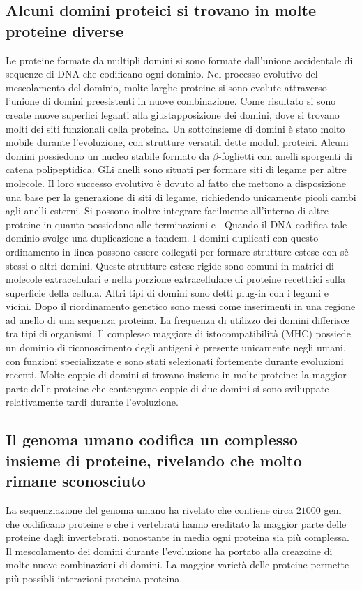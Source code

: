 \subsection{Alcuni domini proteici si trovano in molte proteine diverse}
Le proteine formate da multipli domini si sono formate dall'unione accidentale di sequenze di DNA che codificano ogni dominio. Nel processo evolutivo del mescolamento del dominio, 
molte larghe proteine si sono evolute attraverso l'unione di domini preesistenti in nuove combinazione. Come risultato si sono create nuove superfici leganti alla giustapposizione dei
domini, dove si trovano molti dei siti funzionali della proteina. Un sottoinsieme di domini \`e stato molto mobile durante l'evoluzione, con strutture versatili dette moduli proteici. 
Alcuni domini possiedono un nucleo stabile formato da $\beta$-foglietti con anelli sporgenti di catena polipeptidica. GLi anelli sono situati per formare siti di legame per altre 
molecole. Il loro successo evolutivo \`e dovuto al fatto che mettono a disposizione una base per la generazione di siti di legame, richiedendo unicamente picoli cambi agli anelli 
esterni. Si possono inoltre integrare facilmente all'interno di altre proteine in quanto possiedono alle terminazioni  e . Quando il DNA codifica tale dominio svolge una
duplicazione a tandem. I domini duplicati con questo ordinamento in linea possono essere collegati per formare strutture estese con s\`e stessi o altri domini. Queste strutture estese
rigide sono comuni in matrici di molecole extracellulari e nella porzione extracellulare di proteine recettrici sulla superficie della cellula. Altri tipi di domini sono detti plug-in
con i legami  e  vicini. Dopo il riordinamento genetico sono messi come inserimenti in una regione ad anello di una sequenza proteina. La frequenza di utilizzo dei domini
differisce tra tipi di organismi. Il complesso maggiore di istocompatibilit\`a (MHC) possiede un dominio di riconoscimento degli antigeni \`e presente unicamente negli umani, con 
funzioni specializzate e sono stati selezionati fortemente durante evoluzioni recenti. Molte coppie di domini si trovano insieme in molte proteine: la maggior parte delle proteine che
contengono coppie di due domini si sono sviluppate relativamente tardi durante l'evoluzione.
\subsection{Il genoma umano codifica un complesso insieme di proteine, rivelando che molto rimane sconosciuto}
La sequenziazione del genoma umano ha rivelato che contiene circa $21000$ geni che codificano proteine e che i vertebrati hanno ereditato la maggior parte delle proteine dagli 
invertebrati, nonostante in media ogni proteina sia pi\`u complessa. Il mescolamento dei domini durante l'evoluzione ha portato alla creazoine di molte nuove combinazioni di domini. La
maggior variet\`a delle proteine permette pi\`u possibli interazioni proteina-proteina.
